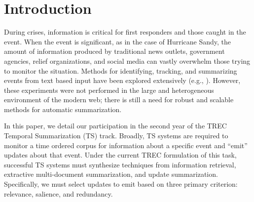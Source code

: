 \documentclass{sig-alternate}
\begin{document}



\section{Introduction}

During crises, information is critical for first responders and those caught
in the event.  When the event is significant, as in the case of Hurricane
Sandy, the amount of information produced by traditional news outlets,
government agencies, relief organizations, and social media can vastly
overwhelm those trying to monitor the situation. Methods for identifying,
tracking, and summarizing events from text based input have been explored
extensively  (e.g.,
\cite{allan1998topic,Filatova&Hatzivassiloglou.04a,Wang&al.11}). However,
these experiments were not performed in the large and heterogeneous
environment of the modern web; there is still a need for robust and scalable 
methods for automatic summarization.




In this paper, we detail our participation in the second year of the TREC
Temporal Summarization (TS) track. Broadly, TS systems are required to monitor
a time ordered corpus for information about a specific event and ``emit'' 
updates about that event. Under the current TREC formulation of this task,
successful TS systems must synthesize techniques from information retrieval,
 extractive multi-document summarization, and update summarization.
Specifically, we must select updates to emit based on three primary criterion:
relevance, salience, and redundancy.
\end{document}
